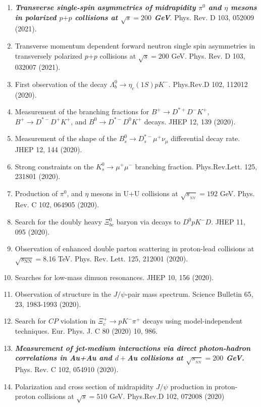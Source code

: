 \documentclass[11pt]{article}
\begin{document}
\begin{flushleft}
\begin{center}
\begin{enumerate}
	\normalsize
		\item {\bf{\textit{Transverse single-spin asymmetries of midrapidity $\pi^0$ and $\eta$ mesons in polarized $p$$+$$p$ collisions at $\sqrt{s}=200$ GeV}}}. Phys. Rev. D 103, 052009 (2021).
	
		\item Transverse momentum dependent forward neutron single spin asymmetries in transversely polarized $p$$+$$p$ collisions at $\sqrt{s}=200$ GeV. Phys. Rev. D 103, 032007 (2021).
		\item First observation of the decay $\Lambda_b^0 \to \eta_c(1S) p K^-$. Phys.Rev.D 102, 112012 (2020).
		\item Measurement of the branching fractions for $B^+\to D^{*+}D^-K^+$, $B^+\to D^{*-}D^+K^+$, and $B^0\to D^{*-}D^0K^+$ decays. JHEP 12, 139 (2020).
		\item Measurement of the shape of the $B_s^0\rightarrow D_s^{*-}\mu^+\nu_\mu$ differential decay rate. JHEP 12, 144 (2020).
		\item Strong constraints on the $K_s^0\rightarrow\mu^+\mu^-$ branching fraction. Phys.Rev.Lett. 125, 231801 (2020).
		\item Production of $\pi^0$, and $\eta$ mesons in U+U collisions at $\sqrt{s_{_{NN}}}=192$ GeV. Phys. Rev. C 102, 064905 (2020).
		\item Search for the doubly heavy $\mathit{\Xi}_{bc}^{0}$ baryon via decays to $D^0pK^-D$. JHEP 11, 095 (2020).
		\item Observation of enhanced double parton scattering in proton-lead collisions at $\sqrt{s_\mathrm{NN}}=$8.16 TeV. Phys. Rev. Lett. 125, 212001 (2020).
		\item Searches for low-mass dimuon resonances. JHEP 10, 156 (2020).
		\item Observation of structure in the $J/\psi$-pair mass spectrum. Science Bulletin 65, 23, 1983-1993 (2020).
		
		\item Search for $CP$ violation in $\Xi_c^+\rightarrow pK^-\pi^+$ decays using model-independent techniques. Eur. Phys. J. C 80 (2020) 10, 986.
		\item \textbf{\textit{Measurement of jet-medium interactions via direct photon-hadron correlations in Au+Au and $d+$Au collisions at $\sqrt{s_{_{NN}}}=200$ GeV.}} Phys. Rev. C 102, 054910 (2020).
		\item Polarization and cross section of midrapidity $J/\psi$ production in proton-proton collisions at $\sqrt{s}=510$ GeV. Phys.Rev.D 102, 072008 (2020)
		

\end{enumerate}
\end{center}
\end{flushleft}
\end{document}
